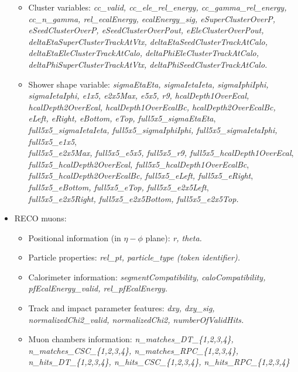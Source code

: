 \begin{itemize}
\begin{itemize}
		\item Cluster variables: \textit{cc\_valid, cc\_ele\_rel\_energy, cc\_gamma\_rel\_energy, cc\_n\_gamma, rel\_ecalEnergy, ecalEnergy\_sig, eSuperClusterOverP, eSeedClusterOverP, eSeedClusterOverPout, eEleClusterOverPout,
		deltaEtaSuperClusterTrackAtVtx, deltaEtaSeedClusterTrackAtCalo, deltaEtaEleClusterTrackAtCalo,
		deltaPhiEleClusterTrackAtCalo, deltaPhiSuperClusterTrackAtVtx, deltaPhiSeedClusterTrackAtCalo.}
		
		\item Shower shape variable: \textit{sigmaEtaEta, sigmaIetaIeta, sigmaIphiIphi, sigmaIetaIphi, e1x5, e2x5Max, e5x5, r9, hcalDepth1OverEcal, hcalDepth2OverEcal, hcalDepth1OverEcalBc, hcalDepth2OverEcalBc, eLeft, eRight, eBottom, eTop, full5x5\_sigmaEtaEta},\\ \textit{full5x5\_sigmaIetaIeta, full5x5\_sigmaIphiIphi, full5x5\_sigmaIetaIphi, full5x5\_e1x5},\\ \textit{full5x5\_e2x5Max, full5x5\_e5x5, full5x5\_r9, full5x5\_hcalDepth1OverEcal},\\ \textit{full5x5\_hcalDepth2OverEcal, full5x5\_hcalDepth1OverEcalBc},\\ \textit{full5x5\_hcalDepth2OverEcalBc, full5x5\_eLeft, full5x5\_eRight},\\ \textit{full5x5\_eBottom, full5x5\_eTop, full5x5\_e2x5Left},\\ \textit{full5x5\_e2x5Right, full5x5\_e2x5Bottom, full5x5\_e2x5Top.}
	\end{itemize}
	\item RECO muons:
	\begin{itemize}
		\item Positional information (in $\eta-\phi$ plane): \textit{r, theta.}
		\item Particle properties:  \textit{rel\_pt, particle\_type (token identifier).}
		\item Calorimeter information: 	\textit{segmentCompatibility, caloCompatibility, pfEcalEnergy\_valid, rel\_pfEcalEnergy.}
		\item Track and impact parameter features: \textit{dxy, dxy\_sig, normalizedChi2\_valid, normalizedChi2, numberOfValidHits.}
		\item Muon chambers information: \textit{n\_matches\_DT\_\{1,2,3,4\}, n\_matches\_CSC\_\{1,2,3,4\}, n\_matches\_RPC\_\{1,2,3,4\}, n\_hits\_DT\_\{1,2,3,4\}, n\_hits\_CSC\_\{1,2,3,4\}, n\_hits\_RPC\_\{1,2,3,4\}}
	\end{itemize}
\end{itemize}
\newpage
